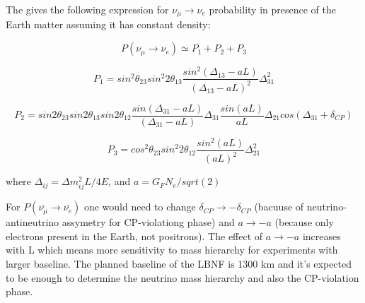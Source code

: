 The \cite{ref_LBNFdoc_volume-physics} gives the following expression for $\nu_\mu \rightarrow \nu_e$ probability in presence of the Earth matter assuming it has constant density: \\
\begin{center}

\begin{equation}
\label{eq:P_bigFormula}
P(\nu_\mu \rightarrow \nu_e) \simeq P_1 + P_2 + P_3 
\end{equation}

\begin{equation}
\label{eq:P_bigFormula_1}
P_1 = sin^2{\theta_{23}}sin^2{2\theta_{13}}\frac{sin^2(\Delta_{13}-aL)}{(\Delta_{13}-aL)^2}\Delta^2_{31}
\end{equation}

\begin{equation}
\label{eq:P_bigFormula_2}
P_2 = sin2\theta_{23}sin2\theta_{13}sin2\theta_{12}\frac{sin(\Delta_{31}-aL)}{(\Delta_{31}-aL)}\Delta_{31}\frac{sin(aL)}{aL}\Delta_{21}cos(\Delta_{31}+\delta_{CP})
\end{equation}

\begin{equation}
\label{eq:P_bigFormula_3}
P_3 = cos^2\theta_{23}sin^2{2\theta_{12}}\frac{sin^2(aL)}{(aL)^2}\Delta^2_{21}
\end{equation}

where $\Delta_{ij}={\Delta}m^2_{ij}L/4E$, and $a={G_F}{N_e}/sqrt(2)$\\
\end{center}

For $P(\bar{\nu_\mu} \rightarrow \bar{\nu_e})$ one would need to change $\delta_{CP} \rightarrow -\delta_{CP}$ (bacuuse of neutrino-antineutrino assymetry for CP-violationg phase) and $a \rightarrow -a$ (because only electrons present in the Earth, not positrons). The effect of $a \rightarrow -a$ increases with L which means more sensitivity to mass hierarchy for experiments with larger baseline. The planned baseline of the LBNF is 1300 km and it's expected to be enough to determine the neutrino mass hierarchy and also the CP-violation phase.

